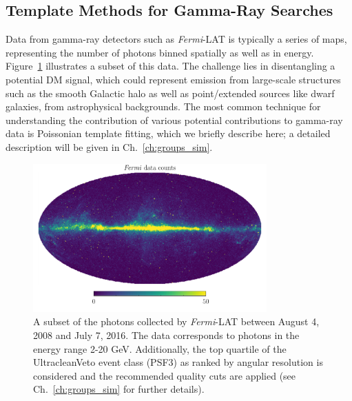 \subsection{Template Methods for Gamma-Ray Searches}
\label{subsec:statmethods}

Data from gamma-ray detectors such as \emph{Fermi}-LAT is typically a series of maps, representing the number of photons binned spatially as well as in energy. Figure~\ref{fig:data} illustrates a subset of this data. The challenge lies in disentangling a potential DM signal, which could represent emission from large-scale structures such as the smooth Galactic halo as well as point/extended sources like dwarf galaxies, from astrophysical backgrounds. The most common technique for understanding the contribution of various potential contributions to gamma-ray data is Poissonian template fitting, which we briefly describe here; a detailed description will be given in Ch.~\ref{ch:groups_sim}. 

\begin{figure}[htbp] 
\centering
 \includegraphics[width=0.8\textwidth]{ch-intro/data.pdf}
\caption{A subset of the photons collected by \emph{Fermi}-LAT between August 4, 2008 and July 7, 2016. The data corresponds to photons in the energy range 2-20 GeV. Additionally, the top quartile of the UltracleanVeto event class (PSF3) as ranked by angular resolution is considered and the recommended quality cuts are applied (see Ch.~\ref{ch:groups_sim} for further details).}  
\label{fig:data}
\end{figure}

